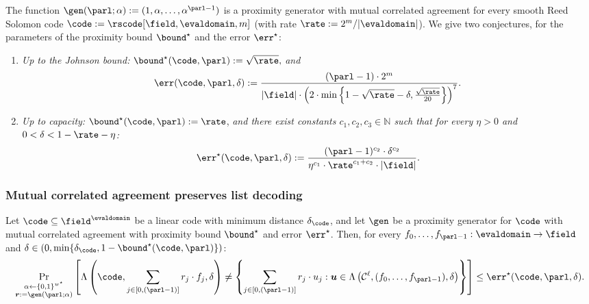 \begin{theorem}\label{conjecture:whir}
    The function $\gen(\parl; \alpha) := (1, \alpha, \ldots, \alpha^{\parl - 1})$ is a proximity generator with mutual correlated agreement for every smooth Reed Solomon code $\code := \rscode[\field, \evaldomain, m]$ (with rate $\rate := 2^m / |\evaldomain|$). We give two conjectures, for the parameters of the proximity bound ${\bound}^\star$ and the error $\err^\star$:
    \begin{enumerate}
        \item \textit{Up to the Johnson bound:} ${\bound}^\star(\code, \parl) := \sqrt{\rate},$ \textit{and}
        \[
        \err(\code, \parl, \delta) := \frac{(\parl - 1) \cdot 2^m}{|\field| \cdot \left( 2 \cdot \min\left\{1 - \sqrt{\rate} - \delta, \frac{\sqrt{\rate}}{20} \right\} \right)^7}.
        \]
      
        \item \textit{Up to capacity:} ${\bound}^\star(\code, \parl) := \rate$, \textit{and there exist constants $c_1, c_2, c_3 \in \mathbb{N}$ such that for every $\eta > 0$ and $0 < \delta < 1 - \rate - \eta$:}
        \[
        \err^\star(\code, \parl, \delta) := \frac{(\parl - 1)^{c_2} \cdot \delta^{c_2}}{\eta^{c_1} \cdot \rate^{c_1 + c_2} \cdot |\field|}.
        \]
      \end{enumerate}
\end{theorem}

\subsubsection{Mutual correlated agreement preserves list decoding}

\begin{lemma}\label{lemma: mutual_corrAgr_listdecoding}
    Let $\code \subseteq \field^{\evaldomain}$ be a linear code with minimum distance $\delta_{\code}$, and let $\gen$ be a proximity generator for $\code$ with mutual correlated agreement with proximity bound ${\bound}^\star$ and error $\err^\star$. Then, for every $f_0, \ldots, f_{\parl-1} : \evaldomain \to \field$ and $\delta \in (0, \min\{\delta_{\code}, 1 - {\bound}^\star(\code, \parl)\})$:
    \[
    \Pr_{\substack{\alpha \leftarrow \{0,1\}^{w^\star} \\ \boldsymbol{r} := \gen(\parl; \alpha)}} \left[
    \Lambda\left(\code, \sum_{j \in [0,(\parl-1)]} r_j \cdot f_j, \delta \right) \neq 
    \left\{ \sum_{j \in [0,(\parl-1)]} r_j \cdot u_j : \boldsymbol{u} \in \Lambda\left(\mathcal{C}^\ell, (f_0, \ldots, f_{\parl-1}), \delta \right) \right\}
    \right] \leq \err^\star(\code, \parl, \delta).
    \]
\end{lemma}

